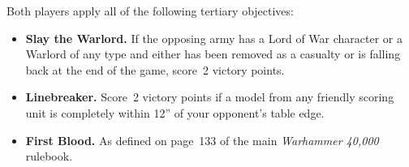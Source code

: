   Both players apply all of
the following tertiary objectives:

\begin{itemize}
\item \textbf{Slay the Warlord.}  If the opposing army has a Lord of
  War character or a Warlord of any type and either has been removed
  as a casualty or is falling back at the end of the game, score~2
  victory points.

\item \textbf{Linebreaker.}  Score~2 victory points if a model from
  any friendly scoring unit is completely within 12'' of your
  opponent's table edge.

\item \textbf{First Blood.}  As defined on page~133 of the main
  \emph{Warhammer 40,000} rulebook.
\end{itemize}
